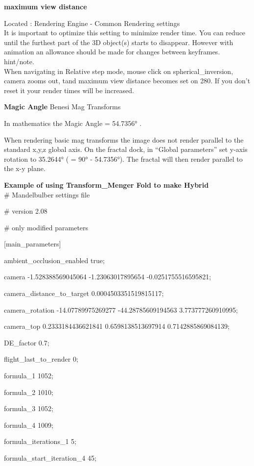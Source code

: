 \textbf{maximum view distance}

Located : Rendering Engine - Common Rendering
settings\\[2\baselineskip]It is important to optimize this setting to
minimize render time. You can reduce until the furthest part of the 3D
object(s) starts to disappear. However with animation an allowance
should be made for changes between
keyframes.\\[2\baselineskip]hint/note.\\
When navigating in Relative step mode, mouse click on
spherical\_inversion, camera zooms out, tand maximum view distance
becomes set on 280. If you don't reset it your render times will be
increased.

\textbf{Magic Angle} Benesi Mag Transforms

In mathematics the Magic Angle = 54.7356° .

When rendering basic mag transforms the image does not render parallel
to the standard x,y,z global axis. On the fractal dock, in ``Global
parameters'' set y-axis rotation to 35.2644° ( = 90° - 54.7356°). The
fractal will then render parallel to the x-y plane.

\textbf{Example of using Transform\_Menger Fold to make
Hybrid}\\[2\baselineskip]\# Mandelbulber settings file

\# version 2.08

\# only modified parameters

{[}main\_parameters{]}

ambient\_occlusion\_enabled true;

camera -1.528388569045064 -1.23063017895654 -0.0251755516595821;

camera\_distance\_to\_target 0.0004503351519815117;

camera\_rotation -14.07789975269277 -44.28785609194563
3.773777260910995;

camera\_top 0.2333184436621841 0.6598138513697914 0.7142885869084139;

DE\_factor 0.7;

flight\_last\_to\_render 0;

formula\_1 1052;

formula\_2 1010;

formula\_3 1052;

formula\_4 1009;

formula\_iterations\_1 5;

formula\_start\_iteration\_4 45;

